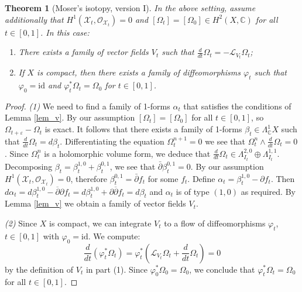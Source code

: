 \documentclass[10pt]{amsart}
\newcommand{\bbC}{\mathbb{C}}
\newcommand{\LL}{\mathcal{L}}
\newcommand{\OO}{\mathcal{O}}
\newcommand{\XX}{\mathcal{X}}
\newcommand{\dd}{\partial}
\newcommand{\ddb}{\overline\partial}
\newtheorem{thm}[defn]{Theorem}
\begin{document}
\begin{thm}[Moser's isotopy, version I]\label{thm_Moser_I}
In the above setting, assume additionally that
$H^1(\XX_t,\OO_{\XX_t}) = 0$ and $[\Omega_t] = [\Omega_0]\in H^2(X,\bbC)$ for all $t\in [0,1]$.
In this case:
\begin{enumerate}
\item There exists a family of vector fields $V_t$ such that $\frac{d}{dt}{\Omega}_t = -\LL_{V_t}\Omega_t$;
\item If $X$ is compact, then there exists a family of diffeomorphisms $\varphi_t$ such that
$\varphi_0 = \mathrm{id}$ and $\varphi_t^*\Omega_t = \Omega_0$ for $t\in [0,1]$.
\end{enumerate}
\end{thm}
\begin{proof}
{\it (1)} We need to find a family of 1-forms $\alpha_t$ that satisfies the
conditions of Lemma \ref{lem_v}. By our assumption $[\Omega_t] = [\Omega_0]$
for all $t\in [0,1]$, so $\Omega_{t+\varepsilon} - \Omega_t$ is exact. It follows that there
exists a family of 1-forms $\beta_t \in \Lambda^1_{\bbC}X$ such that $\frac{d}{dt}\Omega_t = d\beta_t$.
Differentiating the equation $\Omega_t^{n+1} = 0$ we see that $\Omega_t^n\wedge \frac{d}{dt}\Omega_t =0$.
Since $\Omega_t^n$ is a holomorphic volume form, we deduce that $\frac{d}{dt}\Omega_t \in \Lambda^{2,0}_{I_t}\oplus \Lambda^{1,1}_{I_t}$.
Decomposing $\beta_t = \beta_t^{1,0} + \beta_t^{0,1}$, we see that $\bar{\partial} \beta_t^{0,1} = 0$.
By our assumption $H^1(\XX_t,\OO_{\XX_t}) = 0$, therefore $\beta_t^{0,1} = \bar{\partial} f_t$ for
some $f_t$. Define $\alpha_t = \beta_t^{1,0} - \partial f_t$. Then
$d\alpha_t = d\beta_t^{1,0} - \ddb\dd f_t = d\beta_t^{1,0} + \dd \ddb f_t = d\beta_t$
and $\alpha_t$ is of type $(1,0)$ as required. By Lemma \ref{lem_v} we obtain
a family of vector fields $V_t$.

{\it (2)} %
Since $X$ is compact, we can integrate $V_t$ to a flow of diffeomorphisms $\varphi_t$, $t\in[0,1]$
with $\varphi_0 = \mathrm{id}$. We compute:
$$
\frac{d}{dt}(\varphi_t^*\Omega_t) = \varphi_t^*\left(\LL_{V_t}\Omega_t + \frac{d}{dt}\Omega_t\right) = 0
$$
by the definition of $V_t$ in part (1). Since $\varphi_0^*\Omega_0 = \Omega_0$,
we conclude that $\varphi_t^*\Omega_t = \Omega_0$ for all $t\in [0,1]$.
\end{proof}
\end{document}
